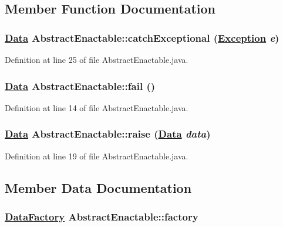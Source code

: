 \subsection{Member Function Documentation}
\hypertarget{classAbstractEnactable_b2}{
\subsubsection[catchExceptional]{\setlength{\rightskip}{0pt plus 5cm}\hyperlink{interfaceData}{Data} Abstract\-Enactable::catch\-Exceptional (\hyperlink{classException}{Exception} {\em e})}}
\label{classAbstractEnactable_b2}




Definition at line 25 of file Abstract\-Enactable.java.\hypertarget{classAbstractEnactable_b0}{
\subsubsection[fail]{\setlength{\rightskip}{0pt plus 5cm}\hyperlink{interfaceData}{Data} Abstract\-Enactable::fail ()}}
\label{classAbstractEnactable_b0}




Definition at line 14 of file Abstract\-Enactable.java.\hypertarget{classAbstractEnactable_b1}{
\subsubsection[raise]{\setlength{\rightskip}{0pt plus 5cm}\hyperlink{interfaceData}{Data} Abstract\-Enactable::raise (\hyperlink{interfaceData}{Data} {\em data})}}
\label{classAbstractEnactable_b1}




Definition at line 19 of file Abstract\-Enactable.java.

\subsection{Member Data Documentation}
\hypertarget{classAbstractEnactable_n0}{
\subsubsection[factory]{\setlength{\rightskip}{0pt plus 5cm}\hyperlink{interfaceDataFactory}{Data\-Factory} Abstract\-Enactable::factory}}
\label{classAbstractEnactable_n0}




